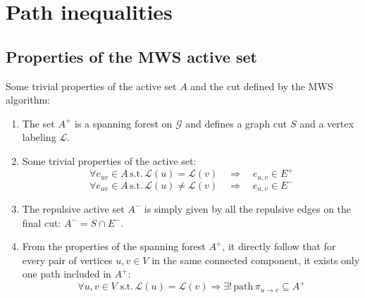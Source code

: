 \documentclass[12pt]{article}
\newcommand\TODO[1]{\fbox{\textcolor{red}{TODO: #1}}}
\begin{document}
\section{Path inequalities}
\subsection{Properties of the MWS active set}

Some trivial properties of the active set $A$ and the cut defined by the MWS algorithm:
\begin{enumerate}
\item The set $A^{+}$ is a spanning forest on $\mathcal{G}$ and defines a graph cut $S$ and a vertex labeling $\mathcal{L}$.
\item Some trivial properties of the active set:
\begin{equation}
\forall e_{uv}\in A \,\mathrm{s.t.}\, \mathcal{L}(u)=\mathcal{L}(v) \quad \Longrightarrow \quad e_{u,v} \in E^+
\end{equation}
\begin{equation}
\forall e_{uv} \in A \,\mathrm{s.t.}\, \mathcal{L}(u)\neq\mathcal{L}(v) \quad \Longrightarrow \quad e_{u,v} \in E^-
\end{equation}
\item The repulsive active set $A^{-}$ is simply given by all the repulsive edges on the final cut: ${A^{-} = S \cap E^{-}}$. %
\item From the properties of the spanning forest $A^+$, it directly follow that for every pair of vertices $u,v\in V$ in the same connected component, it exists only one path included in $A^+$:
\begin{equation}
\forall u,v \in V\,\, \mathrm{s.t.} \, \mathcal{L}(u)=\mathcal{L}(v)  \Longrightarrow \exists ! \, \mathrm{path} \, \pi_{u \rightarrow v}\subseteq A^+
\end{equation}
\end{enumerate}
\end{document}
